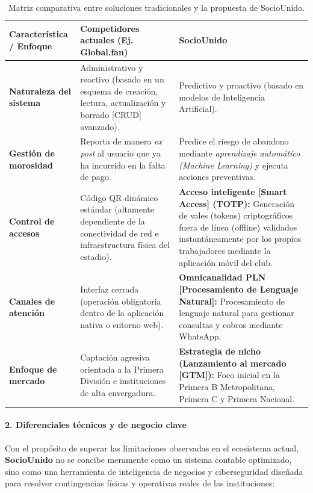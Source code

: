 \begin{table}[h!]
\centering
\renewcommand{\arraystretch}{1.5}
\begin{tabularx}{\textwidth}{|l|X|X|}
\hline
\rowcolor{gray!20} \textbf{Característica / Enfoque} & \textbf{Competidores actuales (Ej. Global.fan)} & \textbf{SocioUnido} \\ \hline
\textbf{Naturaleza del sistema} & Administrativo y reactivo (basado en un esquema de creación, lectura, actualización y borrado [CRUD] avanzado). & Predictivo y proactivo (basado en modelos de Inteligencia Artificial). \\ \hline
\textbf{Gestión de morosidad} & Reporta de manera \textit{ex post} al usuario que ya ha incurrido en la falta de pago. & Predice el riesgo de abandono mediante \textit{aprendizaje automático (Machine Learning)} y ejecuta acciones preventivas. \\ \hline
\textbf{Control de accesos} & Código QR dinámico estándar (altamente dependiente de la conectividad de red e infraestructura física del estadio). & \textbf{Acceso inteligente [Smart Access] (TOTP):} Generación de vales (tokens) criptográficos fuera de línea (offline) validados instantáneamente por los propios trabajadores mediante la aplicación móvil del club. \\ \hline
\textbf{Canales de atención} & Interfaz cerrada (operación obligatoria dentro de la aplicación nativa o entorno web). & \textbf{Omnicanalidad PLN [Procesamiento de Lenguaje Natural]:} Procesamiento de lenguaje natural para gestionar consultas y cobros mediante WhatsApp. \\ \hline
\textbf{Enfoque de mercado} & Captación agresiva orientada a la Primera División e instituciones de alta envergadura. & \textbf{Estrategia de nicho (Lanzamiento al mercado [GTM]):} Foco inicial en la Primera B Metropolitana, Primera C y Primera Nacional. \\ \hline
\end{tabularx}
\caption{Matriz comparativa entre soluciones tradicionales y la propuesta de SocioUnido.}
\label{tab:cuadro_comparativo}
\end{table}

\newpage

\paragraph{2. Diferenciales técnicos y de negocio clave}

Con el propósito de superar las limitaciones observadas en el ecosistema actual, \textbf{SocioUnido} no se concibe meramente como un sistema contable optimizado, sino como una herramienta de inteligencia de negocios y ciberseguridad diseñada para resolver contingencias físicas y operativas reales de las instituciones:

